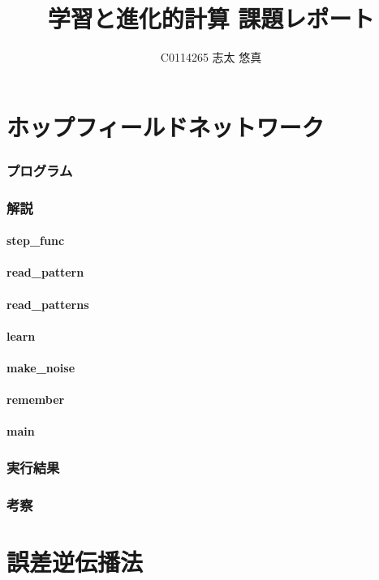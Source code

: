 \documentclass{jsarticle}
\title{学習と進化的計算 課題レポート}
\author{C0114265 志太 悠真}
\begin{document}
\maketitle

\part{ホップフィールドネットワーク}
\section{プログラム}
\section{解説}
\subsection{step\_func}
\subsection{read\_pattern}
\subsection{read\_patterns}
\subsection{learn}
\subsection{make\_noise}
\subsection{remember}
\subsection{main}
\section{実行結果}
\section{考察}

\part{誤差逆伝播法}
\end{document}
